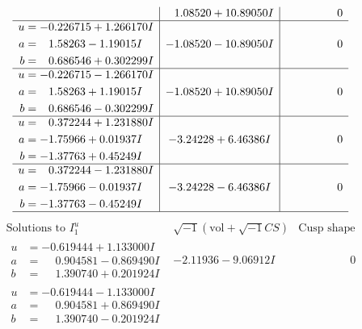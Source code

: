\documentclass[1p]{elsarticle_modified}
\theoremstyle{definition}
\newcommand{\I}{\sqrt{-1}}
\begin{document}
$$\begin{array}{c|c|c}
 & \phantom{-}1.08520 + 10.89050 I & \phantom{-0.000000 } 0 \\ \hline\begin{aligned}
u &= -0.226715 + 1.266170 I \\
a &= \phantom{-}1.58263 - 1.19015 I \\
b &= \phantom{-}0.686546 + 0.302299 I\end{aligned}
 & -1.08520 - 10.89050 I & \phantom{-0.000000 } 0 \\ \hline\begin{aligned}
u &= -0.226715 - 1.266170 I \\
a &= \phantom{-}1.58263 + 1.19015 I \\
b &= \phantom{-}0.686546 - 0.302299 I\end{aligned}
 & -1.08520 + 10.89050 I & \phantom{-0.000000 } 0 \\ \hline\begin{aligned}
u &= \phantom{-}0.372244 + 1.231880 I \\
a &= -1.75966 + 0.01937 I \\
b &= -1.37763 + 0.45249 I\end{aligned}
 & -3.24228 + 6.46386 I & \phantom{-0.000000 } 0 \\ \hline\begin{aligned}
u &= \phantom{-}0.372244 - 1.231880 I \\
a &= -1.75966 - 0.01937 I \\
b &= -1.37763 - 0.45249 I\end{aligned}
 & -3.24228 - 6.46386 I & \phantom{-0.000000 } 0\\
 \hline 
 \end{array}$$\newpage$$\begin{array}{c|c|c}  
\text{Solutions to }I^u_{1}& \I (\text{vol} + \sqrt{-1}CS) & \text{Cusp shape}\\
 \hline 
\begin{aligned}
u &= -0.619444 + 1.133000 I \\
a &= \phantom{-}0.904581 - 0.869490 I \\
b &= \phantom{-}1.390740 + 0.201924 I\end{aligned}
 & -2.11936 - 9.06912 I & \phantom{-0.000000 } 0 \\ \hline\begin{aligned}
u &= -0.619444 - 1.133000 I \\
a &= \phantom{-}0.904581 + 0.869490 I \\
b &= \phantom{-}1.390740 - 0.201924 I\end{aligned}

\end{array}$$
\end{document}
